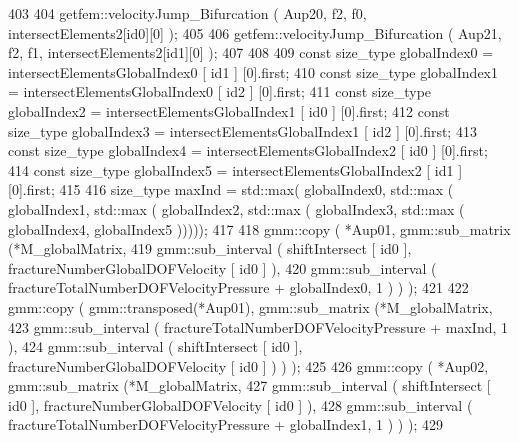 \begin{DoxyCode}
403 \textcolor{comment}{        }
404 \textcolor{comment}{        getfem::velocityJump\_Bifurcation ( Aup20, f2, f0, intersectElements2[id0][0] );}
405 \textcolor{comment}{        }
406 \textcolor{comment}{        getfem::velocityJump\_Bifurcation ( Aup21, f2, f1, intersectElements2[id1][0] );}
407 \textcolor{comment}{        }
408 \textcolor{comment}{        }
409 \textcolor{comment}{        const size\_type globalIndex0 = intersectElementsGlobalIndex0 [ id1 ] [0].first;}
410 \textcolor{comment}{        const size\_type globalIndex1 = intersectElementsGlobalIndex0 [ id2 ] [0].first;}
411 \textcolor{comment}{        const size\_type globalIndex2 = intersectElementsGlobalIndex1 [ id0 ] [0].first;}
412 \textcolor{comment}{        const size\_type globalIndex3 = intersectElementsGlobalIndex1 [ id2 ] [0].first;}
413 \textcolor{comment}{        const size\_type globalIndex4 = intersectElementsGlobalIndex2 [ id0 ] [0].first;}
414 \textcolor{comment}{        const size\_type globalIndex5 = intersectElementsGlobalIndex2 [ id1 ] [0].first;}
415 \textcolor{comment}{        }
416 \textcolor{comment}{        size\_type maxInd =  std::max( globalIndex0, std::max ( globalIndex1, std::max ( globalIndex2,
       std::max ( globalIndex3, std::max ( globalIndex4, globalIndex5 )))));}
417 \textcolor{comment}{}
418 \textcolor{comment}{        gmm::copy ( *Aup01, gmm::sub\_matrix (*M\_globalMatrix,}
419 \textcolor{comment}{                                            gmm::sub\_interval ( shiftIntersect [ id0 ],
       fractureNumberGlobalDOFVelocity [ id0 ] ),}
420 \textcolor{comment}{                                            gmm::sub\_interval (  fractureTotalNumberDOFVelocityPressure +
       globalIndex0, 1 ) ) );}
421 \textcolor{comment}{}
422 \textcolor{comment}{        gmm::copy ( gmm::transposed(*Aup01), gmm::sub\_matrix (*M\_globalMatrix,}
423 \textcolor{comment}{                            gmm::sub\_interval (  fractureTotalNumberDOFVelocityPressure + maxInd, 1 ),}
424 \textcolor{comment}{                            gmm::sub\_interval ( shiftIntersect [ id0 ], fractureNumberGlobalDOFVelocity [
       id0 ] ) ) );}
425 \textcolor{comment}{}
426 \textcolor{comment}{        gmm::copy ( *Aup02, gmm::sub\_matrix (*M\_globalMatrix,}
427 \textcolor{comment}{                                            gmm::sub\_interval ( shiftIntersect [ id0 ],
       fractureNumberGlobalDOFVelocity [ id0 ] ),}
428 \textcolor{comment}{                                            gmm::sub\_interval (  fractureTotalNumberDOFVelocityPressure +
       globalIndex1, 1 ) ) );}
429 \textcolor{comment}{}

\end{DoxyCode}
